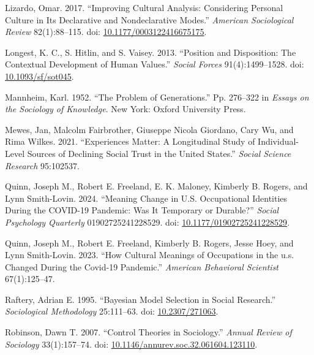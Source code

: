 \documentclass[
  11pt,
]{article}
\newlength{\cslhangindent}
\newenvironment{CSLReferences}[2] %
 {\begin{list}{}{%
  \setlength{\itemindent}{0pt}
  \setlength{\leftmargin}{0pt}
  \setlength{\parsep}{0pt}
  \ifodd #1
   \setlength{\leftmargin}{\cslhangindent}
   \setlength{\itemindent}{-1\cslhangindent}
  \fi
  \setlength{\itemsep}{#2\baselineskip}}}
 {\end{list}}
\begin{document}
\begin{CSLReferences}{1}{1}
Lizardo, Omar. 2017. {``Improving {Cultural} {Analysis}: {Considering}
{Personal} {Culture} in Its {Declarative} and {Nondeclarative}
{Modes}.''} \emph{American Sociological Review} 82(1):88--115. doi:
\href{https://doi.org/10.1177/0003122416675175}{10.1177/0003122416675175}.

Longest, K. C., S. Hitlin, and S. Vaisey. 2013. {``Position and
{Disposition}: {The} {Contextual} {Development} of {Human} {Values}.''}
\emph{Social Forces} 91(4):1499--1528. doi:
\href{https://doi.org/10.1093/sf/sot045}{10.1093/sf/sot045}.

Mannheim, Karl. 1952. {``The {Problem} of {Generations}.''} Pp. 276--322
in \emph{Essays on the {Sociology} of {Knowledge}}. New York: Oxford
University Press.

Mewes, Jan, Malcolm Fairbrother, Giuseppe Nicola Giordano, Cary Wu, and
Rima Wilkes. 2021. {``Experiences Matter: A Longitudinal Study of
Individual-Level Sources of Declining Social Trust in the United
States.''} \emph{Social Science Research} 95:102537.

Quinn, Joseph M., Robert E. Freeland, E. K. Maloney, Kimberly B. Rogers,
and Lynn Smith-Lovin. 2024. {``Meaning {Change} in {U}.{S}.
{Occupational} {Identities} During the {COVID}-19 {Pandemic}: {Was} {It}
{Temporary} or {Durable}?''} \emph{Social Psychology Quarterly}
01902725241228529. doi:
\href{https://doi.org/10.1177/01902725241228529}{10.1177/01902725241228529}.

Quinn, Joseph M., Robert E. Freeland, Kimberly B. Rogers, Jesse Hoey,
and Lynn Smith-Lovin. 2023. {``How Cultural Meanings of Occupations in
the u.s. Changed During the Covid-19 Pandemic.''} \emph{American
Behavioral Scientist} 67(1):125--47.

Raftery, Adrian E. 1995. {``Bayesian {Model} {Selection} in {Social}
{Research}.''} \emph{Sociological Methodology} 25:111--63. doi:
\href{https://doi.org/10.2307/271063}{10.2307/271063}.

Robinson, Dawn T. 2007. {``Control {Theories} in {Sociology}.''}
\emph{Annual Review of Sociology} 33(1):157--74. doi:
\href{https://doi.org/10.1146/annurev.soc.32.061604.123110}{10.1146/annurev.soc.32.061604.123110}.


\end{CSLReferences}
\end{document}
